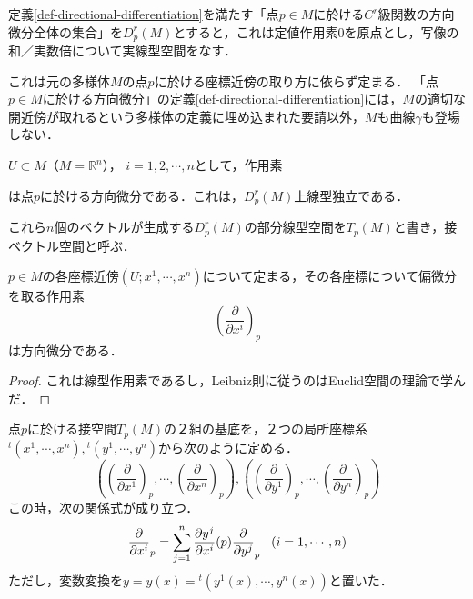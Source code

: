 \documentclass[uplatex, dvipdfmx]{jsreport}
\begin{document}
\begin{proposition}
    定義\ref{def-directional-differentiation}を満たす「点$p\in M$に於ける$C^r$級関数の方向微分全体の集合」を$D^r_p(M)$とすると，これは定値作用素$0$を原点とし，写像の和／実数倍について実線型空間をなす．
\end{proposition}
\begin{remark}
    これは元の多様体$M$の点$p$に於ける座標近傍の取り方に依らず定まる．
    「点$p\in M$に於ける方向微分」の定義\ref{def-directional-differentiation}には，$M$の適切な開近傍が取れるという多様体の定義に埋め込まれた要請以外，$M$も曲線$\gamma$も登場しない．
\end{remark}

\begin{proposition}[方向微分全体のなす線型空間]
    $U\subset M$（$M=\mathbb{R}^n$），
    $i=1,2,\cdots,n$として，作用素
    \begin{center}
    \end{center}
    は点$p$に於ける方向微分である．これは，$D^r_p(M)$上線型独立である．

    これら$n$個のベクトルが生成する$D_p^r(M)$の部分線型空間を$T_p(M)$と書き，接ベクトル空間と呼ぶ．
\end{proposition}

\begin{proposition}
    $p\in M$の各座標近傍$(U;x^1,\cdots,x^n)$について定まる，その各座標について偏微分を取る作用素
    \[\left(\frac{\partial}{\partial x^i}\right)_p\]
    は方向微分である．
\end{proposition}
\begin{proof}
    これは線型作用素であるし，Leibniz則に従うのはEuclid空間の理論で学んだ．
\end{proof}

\begin{proposition}[接空間の基底変換]
    点$p$に於ける接空間$T_p(M)$の２組の基底を，２つの局所座標系${}^t(x^1, \cdots, x^n),{}^t(y^1, \cdots, y^n)$から次のように定める．
    \[ \left( \left(\frac{\partial}{\partial x^1}\right)_p, \cdots, \left(\frac{\partial}{\partial x^n}\right)_p \right), \left( \left(\frac{\partial}{\partial y^1}\right)_p, \cdots, \left(\frac{\partial}{\partial y^n}\right)_p \right) \]
    この時，次の関係式が成り立つ．
    \[ \frac{\partial}{\partial x^i}_p = \sum^n_{j=1}\frac{\partial y^j}{\partial x^i}(p)\frac{\partial}{\partial y^j}_p\hspace{3mm}(i=1,\cdots,n) \]
    ただし，変数変換を$y=y(x)={}^t(y^1(x),\cdots, y^n(x))$と置いた．
\end{proposition}
\end{document}
